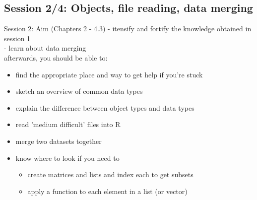 \documentclass[xcolor=table,       handout,    xcolor=dvipsnames]{beamer}\usepackage[]{graphicx}\usepackage[]{color}
\begin{document}
\subsection{Session 2/4: Objects, file reading, data merging}

\begin{frame}{Session 2: Aim (Chapters 2  - 4.3)}
\pause - itensify and fortify the knowledge obtained in session 1\\
\pause - learn about data merging\\
\pause afterwards, you should be able to:
\pause
\begin{itemize}[<+->]
\item find the appropriate place and way to get help if you're stuck
\item sketch an overview of common data types
\item explain the difference between object types and data types
\item read 'medium difficult' files into R
\item merge two datasets together
\item know where to look if you need to
   \begin{itemize}[<+->]
   \item create matrices and lists and index each to get subsets
   \item apply a function to each element in a list (or vector)
   \end{itemize}
\end{itemize}
\end{frame}

\end{document}

